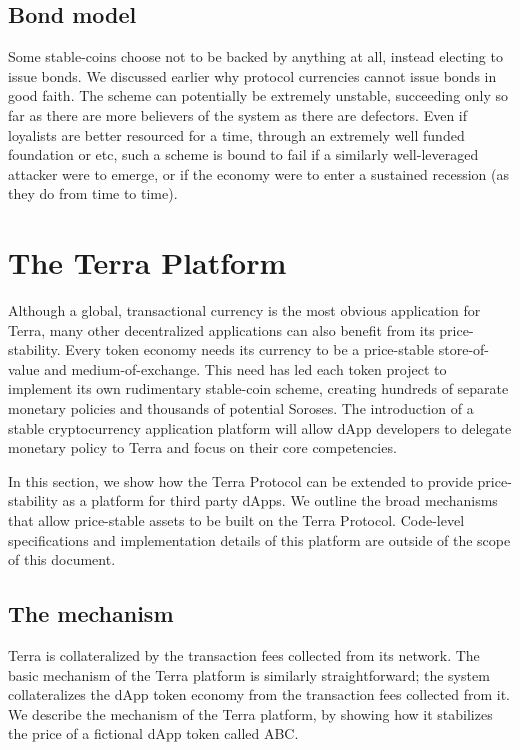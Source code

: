 \documentclass{article}
\begin{document}
\subsection{Bond model}

Some stable-coins choose not to be backed by anything at all, instead electing to issue bonds. We discussed earlier why protocol currencies cannot issue bonds in good faith. The scheme can potentially be extremely unstable, succeeding only so far as there are more believers of the system as there are defectors. Even if loyalists are better resourced for a time, through an extremely well funded foundation or etc, such a scheme is bound to fail if a similarly well-leveraged attacker were to emerge, or if the economy were to enter a sustained recession (as they do from time to time). 

\section{The Terra Platform}

Although a global, transactional currency is the most obvious application for Terra, many other decentralized applications can also benefit from its price-stability. Every token economy needs its currency to be a price-stable store-of-value and medium-of-exchange. This need has led each token project to implement its own rudimentary stable-coin scheme, creating hundreds of separate monetary policies and thousands of potential Soroses. The introduction of a stable cryptocurrency application platform will allow dApp developers to delegate monetary policy to Terra and focus on their core competencies. 

In this section, we show how the Terra Protocol can be extended to provide price-stability as a platform for third party dApps. We outline the broad mechanisms that allow price-stable assets to be built on the Terra Protocol. Code-level specifications and implementation details of this platform are outside of the scope of this document. 

\subsection{The mechanism}

Terra is collateralized by the transaction fees collected from its network. The basic mechanism of the Terra platform is similarly straightforward; the system collateralizes the dApp token economy from the transaction fees collected from it. We describe the mechanism of the Terra platform, by showing how it stabilizes the price of a fictional dApp token called ABC. 
\end{document}
